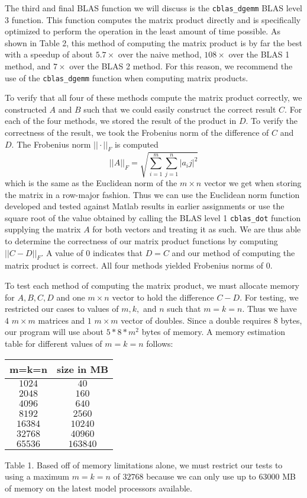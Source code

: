 \documentclass[11pt]{article}
\begin{document}
The third and final BLAS function we will discuss is the \texttt{cblas\_dgemm} BLAS level 3 function. This function computes the matrix product directly and is specifically optimized to perform the operation in the least amount of time possible. As shown in Table 2, this method of computing the matrix product is by far the best with a speedup of about $5.7\times$ over the naive method, $108\times$ over the BLAS 1 method, and $7\times$ over the BLAS 2 method. For this reason, we recommend the use of the \texttt{cblas\_dgemm} function when computing matrix products.

To verify that all four of these methods compute the matrix product correctly, we constructed $A$ and $B$ such that we could easily construct the correct result $C$. For each of the four methods, we stored the result of the product in $D$. To verify the correctness of the result, we took the Frobenius norm of the difference of $C$ and $D$. The Frobenius norm $||\cdot||_F$ is computed
$$ ||A||_F = \sqrt{\sum_{i=1}^{m}{\sum_{j=1}^{n}{|a_ij|^2}}}$$
which is the same as the Euclidean norm of the $m \times n$ vector we get when storing the matrix in a row-major fashion. Thus we can use the Euclidean norm function developed and tested against Matlab results in earlier assignments or use the square root of the value obtained by calling the BLAS level 1 \texttt{cblas\_dot} function supplying the matrix $A$ for both vectors and treating it as such. We are thus able to determine the correctness of our matrix product functions by computing $ ||C-D||_F$. A value of $0$ indicates that $D=C$ and our method of computing the matrix product is correct. All four methods yielded Frobenius norms of $0$.

To test each method of computing the matrix product, we must allocate memory for $A, B, C, D$ and one $m \times n$ vector to hold the difference $C-D$. For testing, we restricted our cases to values of $m,k,$ and $n$ such that $m=k=n$. Thus we have $4$ $m \times m$ matrices and $1$ $m \times m$ vector of doubles. Since a double requires $8$ bytes, our program will use about $5*8*m^2$ bytes of memory. A memory estimation table for different values of $m=k=n$ follows:
\begin{center}
\begin{tabular}{ |c|c| } 
\hline
m=k=n & size in MB \\
\hline
$1024 $& $ 40 $\\ 
$2048$ & $ 160 $\\
$4096$ & $ 640 $\\
$8192$ & $ 2560 $\\
$16384$ & $ 10240 $\\
$32768$ & $ 40960 $\\
$65536$ & $ 163840 $\\
\hline
\end{tabular}
\end{center}
Table 1. Based off of memory limitations alone, we must restrict our tests to using a maximum $m=k=n$ of $32768$ because we can only use up to $63000$ MB of memory on the latest model processors available.
\end{document}
